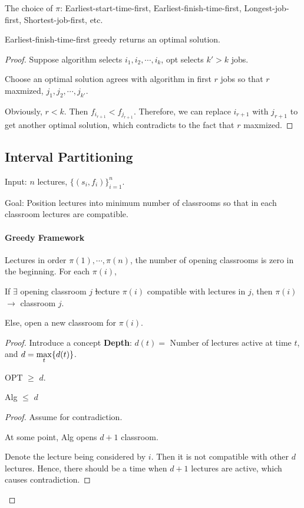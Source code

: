 The choice of $ \pi $: Earliest-start-time-first, Earliest-finish-time-first, Longest-job-first, Shortest-job-first, etc.
\begin{theorem}
    Earliest-finish-time-first greedy returns an optimal solution.
\end{theorem}
\begin{proof}
    Suppose algorithm selects  $ i_1,i_2,\cdots,i_k $, opt selects  $ k'>k $ jobs.
    
    Choose an optimal solution agrees with algorithm in first  $ r $ jobs so that  $ r  $ maxmized,  $ j_1,j_2,\cdots,j_{k'} $.

    Obviously,  $ r<k $. Then  $ f_{i_{r+1}}<f_{j_{r+1}} $. Therefore, we can replace  $ i_{r+1} $ with  $ j_{r+1} $ to get another optimal solution, which contradicts to the fact that  $ r $ maxmized.
\end{proof}

\subsection{Interval Partitioning}
\begin{example}
    Input:  $ n $  lectures,  $ \{(s_i,f_i)\}_{i=1}^n $.
    
    Goal: Position lectures into minimum number of  classrooms so that in each classroom lectures are compatible.
\end{example}
\paragraph{Greedy Framework} Lectures in order  $ \pi(1),\cdots,\pi(n) $, the number of  opening classrooms is zero in the beginning. For each  $ \pi(i) $,

If  $ \exists $ opening classroom  $ j $ \st lecture  $ \pi(i) $ compatible with lectures in  $ j $, then  $ \pi(i) $ $ \rightarrow $ classroom  $ j $.

Else, open a new classroom for  $ \pi(i) $. 

\begin{proof}
    Introduce a concept \textbf{Depth}:  $ d(t)=  $ Number of lectures active at time  $ t $, and  $ d=\displaystyle\max_{t}\{d(t)\} $.
    \begin{claim}
        OPT $ \geq  $  $ d $.  
    \end{claim}   
    \begin{lemma}
        Alg  $ \leq  $ $ d $  
    \end{lemma}
    \begin{proof}
        Assume for contradiction.

        At some point, Alg opens  $ d+1  $ classroom.

        Denote the lecture being considered by  $ i $. Then it is not compatible with other  $ d $ lectures. Hence, there should be a time when  $ d+1 $ lectures are active, which causes contradiction.  
    \end{proof}
\end{proof}


